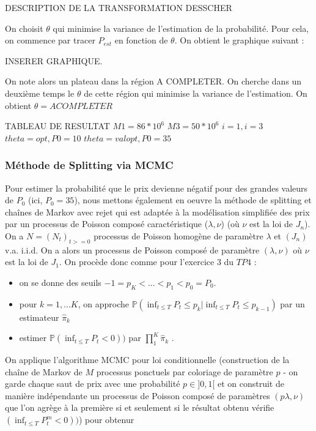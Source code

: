 \documentclass[a4paper,11pt]{article}
\begin{document}
DESCRIPTION DE LA TRANSFORMATION DESSCHER

On choisit $\theta$ qui minimise la variance de l'estimation de la probabilité. Pour cela, on commence par tracer $P_{est}$ en fonction de $\theta$. On obtient le graphique suivant :

INSERER GRAPHIQUE.

On note alors un plateau dans la région A COMPLETER. On cherche dans un deuxième temps le $\theta$ de cette région qui minimise la variance de l'estimation. 
On obtient $\theta= A COMPLETER$

TABLEAU DE RESULTAT
$M1=86 * 10^6$
$M3=50 * 10^6$
$i=1, i=3$
$theta=opt, P0=10$
$theta=val opt, P0=35$

\subsubsection{Méthode de Splitting via MCMC}
Pour estimer la probabilité que le prix devienne négatif pour des grandes valeurs de $P_0$ (ici, $P_0 = 35$), nous mettons également en oeuvre la méthode de splitting et chaînes de Markov avec rejet qui est adaptée à la modélisation simplifiée des prix par un processus de Poisson composé caractéristique ($\lambda,\nu$) (où $\nu$ est la loi de $J_n$).\\
On a $N = (N_t)_{t>=0}$ processus de Poisson homogène de paramètre $\lambda$ et $(J_n)$ v.a. i.i.d. On a alors un processus de Poisson composé de paramètre $(\lambda,\nu)$ où $\nu$ est la loi de $J_1$.
On procède donc comme pour l'exercice $3$ du $TP4$ : 
\begin{itemize}
\item on se donne des seuils $-1=p_K<...<p_1<p_0=P_0$.\\
\item pour $k=1,...K$, on approche $\mathbb{P} (\inf_{t \leq T} P_t \leq p_k | \inf_{t \leq T} P_t \leq p_{k-1})$ par un estimateur $\widehat{\pi}_k$
\item estimer $\mathbb{P} (\inf_{t \leq T} P_t < 0))$ par $\prod_1^K \widehat{\pi}_k$ .
\end{itemize}

On applique l'algorithme MCMC pour loi conditionnelle (construction de la chaîne de Markov de $M$ processus ponctuels par coloriage de paramètre $p$ - on garde chaque saut de prix avec une probabilité $p \in ]0,1[$ et on construit de manière indépendante un processus de Poisson composé de paramètres $(p\lambda,\nu)$ que l'on agrège à la première si et seulement si le résultat obtenu vérifie $(\inf_{t \leq T} P_t^m < 0))$) pour obtenur 
\end{document}
